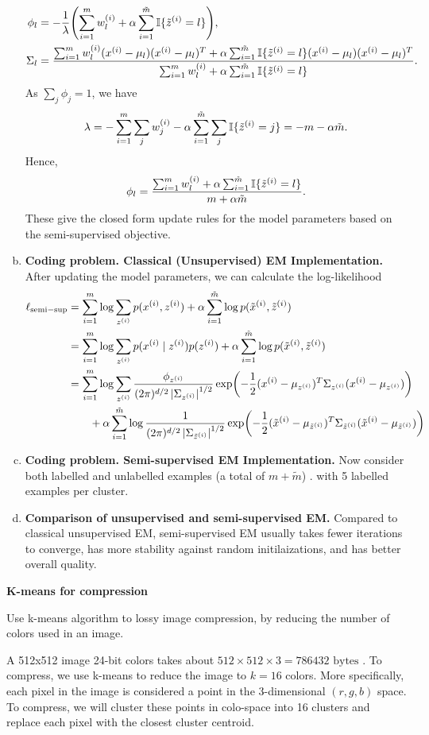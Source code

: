 \documentclass[12pt,letterpaper,boxed]{hmcpset}
\newcommand{\ww}{w^{(i)}}
\newcommand{\ind}[1]{\mathbb{I}\{#1\}}
\newcommand{\lsemi}{\ell_{\mathrm{semi-sup}}}
\newcommand{\summ}{\sum_{i=1}^m}
\newcommand{\sumtm}{\sum_{i=1}^{\tilde m}}
\begin{document}
\begin{solution}
\begin{enumerate}[(a)]
\[\begin{aligned}
      \phi_l &= - \frac{1}{\lambda} \qty(\summ \ww_l + \alpha \sumtm \ind{\tzz = l}), \\
      \Sigma_l &= \frac{\summ \ww_l (\xx - \mu_l)(\xx - \mu_l)^T + \alpha \sumtm \ind{\tzz = l} (\xx - \mu_l)(\xx - \mu_l)^T}{\summ \ww_l + \alpha \sumtm \ind{\tzz = l}}.
    \end{aligned}
    \]
    As $\sum_j \phi_j = 1$, we have
    \[
    \lambda = - \summ \sum_j \ww_j - \alpha \sumtm \sum_j\ind{\tzz = j} = - m - \alpha \tilde{m}.
    \]
    Hence,
    \[
    \phi_l = \frac{\summ \ww_l + \alpha \sumtm \ind{\tzz = l}}{m + \alpha \tilde{m}}.
    \]
    These give the closed form update rules for the model parameters based on the semi-supervised objective.

    \item \textbf{Coding problem. Classical (Unsupervised) EM Implementation.} After updating the model parameters, we can calculate the log-likelihood
    \[
    \begin{aligned}
      \lsemi &= \summ \log \sum_{\zz} p(\xx, \zz) + \alpha \sumtm \log p(\txx, \tzz) \\
      &= \summ \log \sum_{\zz} p(\xx \mid \zz) p(\zz) + \alpha \sumtm \log p(\txx, \tzz) \\
      &= \summ \log \sum_{\zz} \frac{\phi_{\zz}}{(2\pi)^{d/2} \abs{\Sigma_{\zz}}^{1/2}} \exp(-\frac{1}{2}(\xx - \mu_{\zz})^T \Sigma_{\zz} (\xx - \mu_{\zz})) \\
      & \qquad + \alpha \sumtm \log \frac{1}{(2\pi)^{d/2} \abs{\Sigma_{\tzz}}^{1/2}} \exp(-\frac{1}{2}(\txx - \mu_{\tzz})^T \Sigma_{\tzz} (\txx - \mu_{\tzz}))
    \end{aligned}
    \]

    \item \textbf{Coding problem. Semi-supervised EM Implementation.} Now consider both labelled and unlabelled examples (a total of $m + \tilde{m}$) . with 5 labelled examples per cluster.
    
    \item \textbf{Comparison of unsupervised and semi-supervised EM.} Compared to classical unsupervised EM, semi-supervised EM usually takes fewer iterations to converge, has more stability against random initilaizations, and has better overall quality.
  \end{enumerate}
\end{solution}

\begin{problem}[Problem 5]
  \textbf{K-means for compression}

  Use k-means algorithm to lossy image compression, by reducing the number of colors used in an image.

  A 512x512 image 24-bit colors takes about $512 \times 512 \times 3 = 786432 \text{ bytes }$. To compress, we use k-means to reduce the image to $k = 16$ colors. More specifically, each pixel in the image is considered a point in the 3-dimensional $(r,g,b)$ space. To compress, we will cluster these points in colo-space into 16 clusters and replace each pixel with the closest cluster centroid.
\end{problem}
\end{document}
